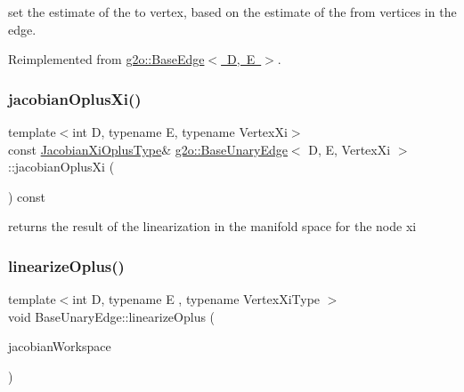 set the estimate of the to vertex, based on the estimate of the from vertices in the edge. 

Reimplemented from \mbox{\hyperlink{classg2o_1_1_base_edge_a0c3d9763f1dc504627df75e0f381ca70}{g2o\+::\+Base\+Edge$<$ D, E $>$}}.

\mbox{\label{classg2o_1_1_base_unary_edge_a396fbab83bfc9ce2e2080b16ccc357f4}} 
\subsubsection{\texorpdfstring{jacobian\+Oplus\+Xi()}{jacobianOplusXi()}}
{\footnotesize\ttfamily template$<$int D, typename E, typename Vertex\+Xi$>$ \\
const \mbox{\hyperlink{classg2o_1_1_base_unary_edge_a24bcabd661223e15b7337f2835310f5e}{Jacobian\+Xi\+Oplus\+Type}}\& \mbox{\hyperlink{classg2o_1_1_base_unary_edge}{g2o\+::\+Base\+Unary\+Edge}}$<$ D, E, Vertex\+Xi $>$\+::jacobian\+Oplus\+Xi (\begin{DoxyParamCaption}{ }\end{DoxyParamCaption}) const\hspace{0.3cm}{\ttfamily [inline]}}



returns the result of the linearization in the manifold space for the node xi 

\mbox{\label{classg2o_1_1_base_unary_edge_a8b396647b5b438d30a04758023baa595}} 
\subsubsection{\texorpdfstring{linearize\+Oplus()}{linearizeOplus()}\hspace{0.1cm}{\footnotesize\ttfamily [1/2]}}
{\footnotesize\ttfamily template$<$int D, typename E , typename Vertex\+Xi\+Type $>$ \\
void Base\+Unary\+Edge\+::linearize\+Oplus (\begin{DoxyParamCaption}\item[{\mbox{\hyperlink{classg2o_1_1_jacobian_workspace}{Jacobian\+Workspace}} \&}]{jacobian\+Workspace }\end{DoxyParamCaption})\hspace{0.3cm}{\ttfamily [virtual]}}

